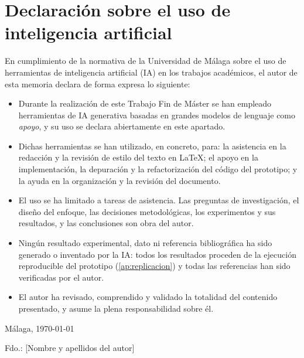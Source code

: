 
\chapter*{Declaración sobre el uso de inteligencia artificial}

En cumplimiento de la normativa de la Universidad de Málaga sobre el uso de
herramientas de inteligencia artificial (IA) en los trabajos académicos, el
autor de esta memoria declara de forma expresa lo siguiente:

\begin{itemize}
  \item Durante la realización de este Trabajo Fin de Máster se han empleado
  herramientas de IA generativa basadas en grandes modelos de lenguaje como
  \emph{apoyo}, y su uso se declara abiertamente en este apartado.

  \item Dichas herramientas se han utilizado, en concreto, para: la asistencia
  en la redacción y la revisión de estilo del texto en \LaTeX; el apoyo en la
  implementación, la depuración y la refactorización del código del prototipo; y
  la ayuda en la organización y la revisión del documento.

  \item El uso se ha limitado a tareas de asistencia. Las preguntas de
  investigación, el diseño del enfoque, las decisiones metodológicas, los
  experimentos y sus resultados, y las conclusiones son obra del autor.

  \item Ningún resultado experimental, dato ni referencia bibliográfica ha sido
  generado o inventado por la IA: todos los resultados proceden de la ejecución
  reproducible del prototipo (\autoref{ap:replicacion}) y todas las referencias
  han sido verificadas por el autor.

  \item El autor ha revisado, comprendido y validado la totalidad del contenido
  presentado, y asume la plena responsabilidad sobre él.
\end{itemize}

\vspace{2em}
\noindent Málaga, \today

\vspace{3em}
\noindent Fdo.: [Nombre y apellidos del autor]

